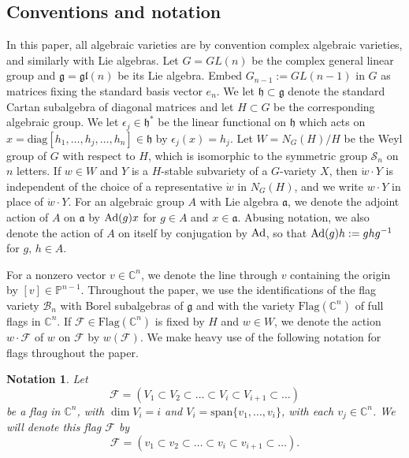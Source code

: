 \documentclass[12pt]{amsart}
\numberwithin{equation}{section}
\newtheorem{nota}[thm]{Notation}
\newcommand{\fa}{\mbox{${\mathfrak a}$}}
\newcommand{\fg}{\mbox{${\mathfrak g}$}}
\newcommand{\fh}{\mbox{${\mathfrak h}$}}
\newcommand{\eps}{\epsilon}
\newcommand{\C}{\mbox{${\mathbb C}$}}
\newcommand{\Ad}{{\rm Ad}}
\newcommand{\fgl}{\mathfrak{gl}}
\newcommand{\B}{\mathcal{B}}
\newcommand{\F}{\mathcal{F}}
\newcommand{\Borbitspace}{B_{n-1}\backslash\B_{n}}
\begin{document}



\subsection{Conventions and notation }\label{s:notation}
In this paper, all algebraic varieties are by convention complex algebraic varieties, and similarly with Lie algebras.  Let $G=GL(n)$ be the complex general linear group and $\fg=\fgl(n)$ be its Lie algebra.  Embed $G_{n-1}:=GL(n-1)$ in $G$ as matrices fixing the standard basis vector $e_{n}$. We let $\fh\subset \fg$ denote the standard Cartan subalgebra of diagonal matrices and let $H\subset G$ be the corresponding algebraic group.  We let $\eps_{j}\in\fh^{*}$ be the linear functional on $\fh$ which acts on $x= \mbox{diag}[h_{1},\dots, h_{j},\dots, h_{n}]\in\fh$ by $\eps_{j}(x)=h_{j}$.  Let $W=N_{G}(H)/H$ be the Weyl group of $G$ with respect to $H$, which is isomorphic to the symmetric group $\mathcal{S}_n$ on $n$ letters.   If $w \in W$ and $Y$ is a $H$-stable subvariety of a $G$-variety $X$, then $\dot{w}\cdot Y$ is independent of the choice of a representative $\dot{w}$ in $N_G(H)$, and we write $w\cdot Y$ in place of $\dot{w}\cdot Y$.  For an algebraic group $A$ with Lie algebra $\fa$, we denote the adjoint action of $A$ on $\fa$ by $\Ad(g)x$ for $g\in A$ and $x\in\fa$.  Abusing notation, we also denote the action of $A$ on itself by conjugation by $\Ad$, so that $\Ad(g)h:=ghg^{-1}$ for $g,\, h\in A$. 


For a nonzero vector $v\in\C^{n}$, we denote the line through $v$ containing the origin by $[v]\in\mathbb{P}^{n-1}$.  Throughout the paper, we use the identifications of the flag variety $\B_{n}$ with Borel subalgebras of $\fg$ and with the variety
 $\mbox{Flag}(\C^{n})$ of full
flags in $\C^{n}$.  If $\F\in \mbox{Flag}(\C^{n})$ is fixed by $H$ and $w\in W$, we denote the action $w\cdot \F$ of $w$ on $\F$ by $w(\F)$.  We make heavy use of the following notation for flags throughout the paper.  
\begin{nota}\label{nota:standard} Let 
   $$
  \mathcal{F}=(V_{1}\subset V_{2}\subset\dots\subset V_{i}\subset V_{i+1}\subset \dots)
   $$
be a flag in $\C^{n}$, with $\dim V_{i}=i$ and $V_{i}=\mbox{span}\{v_{1},\dots, v_{i}\}$, with each $v_{j}\in\C^{n}$.  We will denote this flag $\mathcal{F}$ 
by
   $$
  \mathcal{F}=  (v_{1}\subset  v_{2}\subset\dots\subset v_{i}\subset v_{i+1}\subset\dots ). 
   $$
\end{nota}
\end{document}
